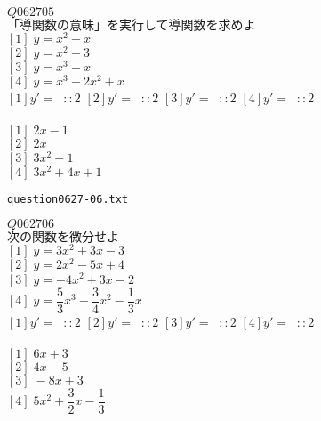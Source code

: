 \documentclass[10pt,dvipdfmx]{jarticle}
\begin{document}
$Q062705$\\
$\text{「導関数の意味」を実行して導関数を求めよ}$\\
$[1]\;y=x^2-x$\\
$[2]\;y=x^2-3$\\
$[3]\;y=x^3-x$\\
$[4]\;y=x^3+2x^2+x$\\
$[1]y'=\;\;::2$ 
$[2]y'=\;\;::2$ 
$[3]y'=\;\;::2$ 
$[4]y'=\;\;::2$ 
\\
\\
$[1]\;2x-1$\\
$[2]\;2x$\\
$[3]\;3x^2-1$\\
$[4]\;3x^2+4x+1$\\
\newpage
\begin{center}
\verb|question0627-06.txt|\\
\end{center}
$Q062706$\\
$\text{次の関数を微分せよ}$\\
$[1]\;y=3x^2+3x-3$\\
$[2]\;y=2x^2-5x+4$\\
$[3]\;y=-4x^2+3x-2$\\
$[4]\;y=\dfrac{5}{3}x^3+\dfrac{3}{4}x^2-\dfrac{1}{3}x$\\
$[1]y'=\;\;::2$ 
$[2]y'=\;\;::2$ 
$[3]y'=\;\;::2$ 
$[4]y'=\;\;::2$ 
\\
\\
$[1]\;6x+3$\\
$[2]\;4x-5$\\
$[3]\;-8x+3$\\
$[4]\;5x^2+\dfrac{3}{2}x-\dfrac{1}{3}$\\
\newpage
\end{document}
